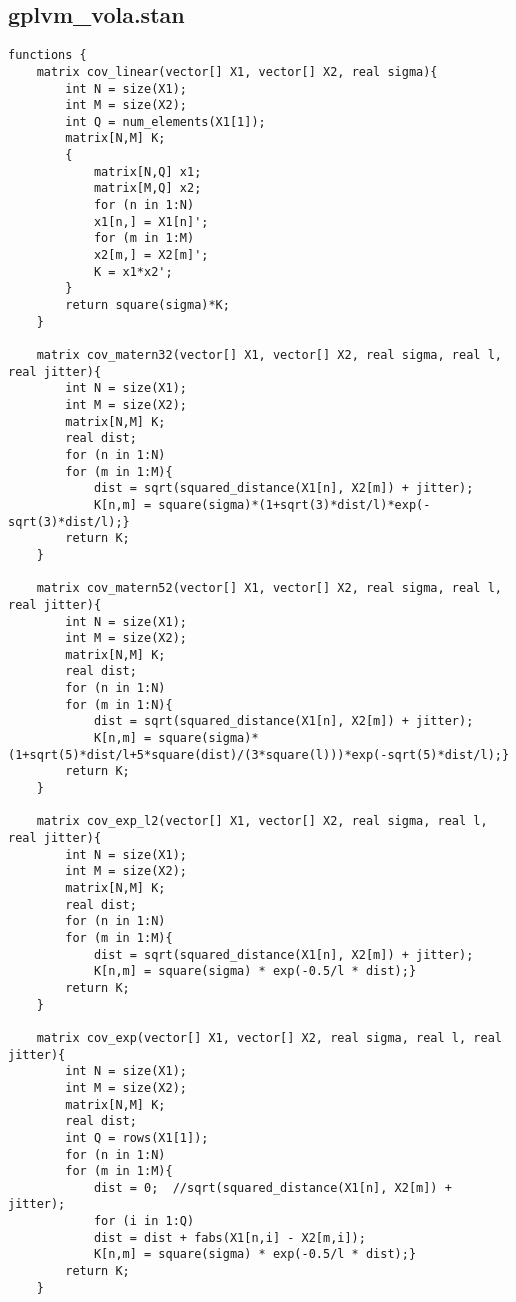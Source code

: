 \subsection{gplvm\_vola.stan}
\lstset{basicstyle=\tiny, style=Stan}
\begin{lstlisting}
functions {
	matrix cov_linear(vector[] X1, vector[] X2, real sigma){
		int N = size(X1);
		int M = size(X2);
		int Q = num_elements(X1[1]);
		matrix[N,M] K;
		{
			matrix[N,Q] x1;
			matrix[M,Q] x2;
			for (n in 1:N)
			x1[n,] = X1[n]';
			for (m in 1:M)
			x2[m,] = X2[m]';
			K = x1*x2';
		}
		return square(sigma)*K;
	}
	
	matrix cov_matern32(vector[] X1, vector[] X2, real sigma, real l, real jitter){
		int N = size(X1);
		int M = size(X2);
		matrix[N,M] K;
		real dist;
		for (n in 1:N)
		for (m in 1:M){
			dist = sqrt(squared_distance(X1[n], X2[m]) + jitter);
			K[n,m] = square(sigma)*(1+sqrt(3)*dist/l)*exp(-sqrt(3)*dist/l);}
		return K;
	}
	
	matrix cov_matern52(vector[] X1, vector[] X2, real sigma, real l, real jitter){
		int N = size(X1);
		int M = size(X2);
		matrix[N,M] K;
		real dist;
		for (n in 1:N)
		for (m in 1:N){
			dist = sqrt(squared_distance(X1[n], X2[m]) + jitter);
			K[n,m] = square(sigma)*(1+sqrt(5)*dist/l+5*square(dist)/(3*square(l)))*exp(-sqrt(5)*dist/l);}
		return K;
	}
	
	matrix cov_exp_l2(vector[] X1, vector[] X2, real sigma, real l, real jitter){
		int N = size(X1);
		int M = size(X2);
		matrix[N,M] K;
		real dist;
		for (n in 1:N)
		for (m in 1:M){
			dist = sqrt(squared_distance(X1[n], X2[m]) + jitter);
			K[n,m] = square(sigma) * exp(-0.5/l * dist);}
		return K;
	}
	
	matrix cov_exp(vector[] X1, vector[] X2, real sigma, real l, real jitter){
		int N = size(X1);
		int M = size(X2);
		matrix[N,M] K;
		real dist;
		int Q = rows(X1[1]);
		for (n in 1:N)
		for (m in 1:M){
			dist = 0;  //sqrt(squared_distance(X1[n], X2[m]) + jitter);
			for (i in 1:Q)
			dist = dist + fabs(X1[n,i] - X2[m,i]);
			K[n,m] = square(sigma) * exp(-0.5/l * dist);}
		return K;
	}
	

\end{lstlisting}

